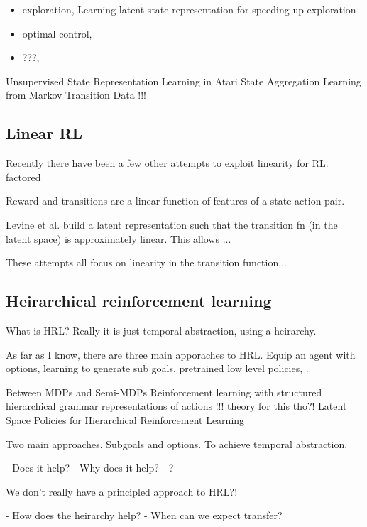 \begin{itemize}
\tightlist
\item
  exploration, Learning latent state representation for speeding up exploration \cite{Vezzani2019}
\item
  optimal control,
\item
  ???,
\end{itemize}

Unsupervised State Representation Learning in Atari  \cite{Anand2019}
State Aggregation Learning from Markov Transition Data  !!!\cite{Duan2018}

\subsection{Linear RL}

Recently there have been a few other attempts to exploit linearity for RL.
\cite{Pires2016} factored

\cite{Wang} Reward and transitions are a linear function of features of a state-action pair.

Levine et al. \cite{Levine2019} build a latent representation such that the transition fn (in the latent space) is approximately linear. This allows ...

These attempts all focus on linearity in the transition function...

\subsection{Heirarchical reinforcement learning}

What is HRL? Really it is just temporal abstraction, using a heirarchy.

As far as I know, there are three main apporaches to HRL.
Equip an agent with options, learning to generate sub goals, pretrained low level policies, .


Between MDPs and Semi-MDPs \cite{RichardS.SuttonaDoinaPrecupb1998}
Reinforcement learning with structured hierarchical grammar representations of actions  \cite{Christodoulou2019}  !!! theory for this tho?!
Latent Space Policies for Hierarchical Reinforcement Learning \cite{Haarnoja}

Two main approaches. Subgoals and options. To achieve temporal abstraction.

- Does it help?
- Why does it help?
- ?

We don't really have a principled approach to HRL?!

- How does the heirarchy help?
- When can we expect transfer?

